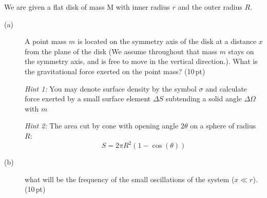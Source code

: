We are given a flat disk of mass M with inner radius $r$ and the outer radius
$R$.

\begin{description}
\item[(a)] A point mass $m$ is located on the symmetry axis of the disk at a
  distance $x$ from the plane of the disk (We assume throughout that mass $m$
  stays on the symmetry axis, and is free to move in the vertical direction.).
  What is the gravitational force exerted on the point mass? \hfill(10\,pt)


  \emph{Hint 1:} You may denote surface density by the symbol $\sigma$ and
  calculate force exerted by a small surface element $\Delta S$ subtending a
  solid angle $\Delta\Omega$ with $m$

  \emph{Hint 2:} The area cut by cone with opening angle $2\theta$ on a sphere
  of radius $R$:
  \[ S = 2\pi R^2 (1 - \cos(\theta)) \]


\item[(b)] what will be the frequency of the small oscillations of the system
  ($x \ll r$). \hfill(10\,pt)
\end{description}
